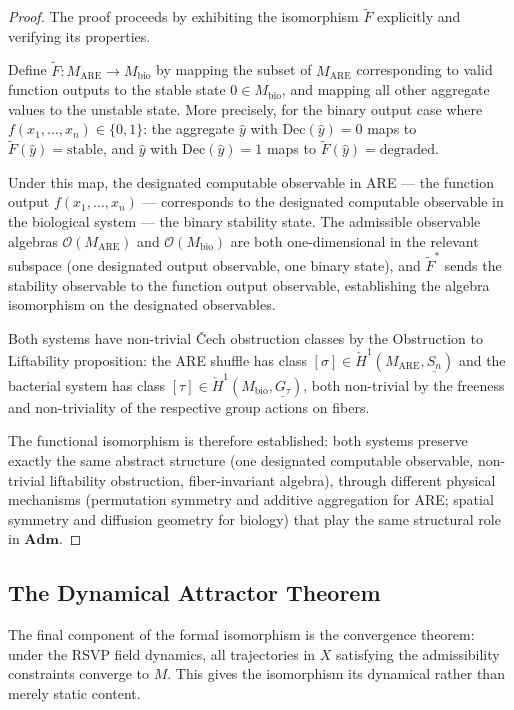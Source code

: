 \documentclass[12pt, a4paper]{article}
\theoremstyle{essaystyle}
\begin{document}
\begin{proof}
The proof proceeds by exhibiting the isomorphism $\tilde{F}$ explicitly and verifying
its properties.

Define $\tilde{F} : M_{\mathrm{ARE}} \to M_{\mathrm{bio}}$ by mapping the subset of
$M_{\mathrm{ARE}}$ corresponding to valid function outputs to the stable state
$0 \in M_{\mathrm{bio}}$, and mapping all other aggregate values to the unstable state.
More precisely, for the binary output case where $f(x_1, \ldots, x_n) \in \{0,1\}$:
the aggregate $\hat{y}$ with $\mathrm{Dec}(\hat{y}) = 0$ maps to $\tilde{F}(\hat{y}) =
\text{stable}$, and $\hat{y}$ with $\mathrm{Dec}(\hat{y}) = 1$ maps to
$\tilde{F}(\hat{y}) = \text{degraded}$.

Under this map, the designated computable observable in ARE --- the function output
$f(x_1, \ldots, x_n)$ --- corresponds to the designated computable observable in the
biological system --- the binary stability state. The admissible observable algebras
$\mathcal{O}(M_{\mathrm{ARE}})$ and $\mathcal{O}(M_{\mathrm{bio}})$ are both one-dimensional
in the relevant subspace (one designated output observable, one binary state), and
$\tilde{F}^*$ sends the stability observable to the function output observable, establishing
the algebra isomorphism on the designated observables.

Both systems have non-trivial Čech obstruction classes by the Obstruction to Liftability
proposition: the ARE shuffle has class $[\sigma] \in \check{H}^1(M_{\mathrm{ARE}},
\underline{S_n})$ and the bacterial system has class $[\tau] \in \check{H}^1(M_{\mathrm{bio}},
\underline{G_\tau})$, both non-trivial by the freeness and non-triviality of the
respective group actions on fibers.

The functional isomorphism is therefore established: both systems preserve exactly the
same abstract structure (one designated computable observable, non-trivial liftability
obstruction, fiber-invariant algebra), through different physical mechanisms (permutation
symmetry and additive aggregation for ARE; spatial symmetry and diffusion geometry for
biology) that play the same structural role in $\mathbf{Adm}$.
\end{proof}

\subsection{The Dynamical Attractor Theorem}

The final component of the formal isomorphism is the convergence theorem: under the
RSVP field dynamics, all trajectories in $X$ satisfying the admissibility constraints
converge to $M$. This gives the isomorphism its dynamical rather than merely static
content.
\end{document}
